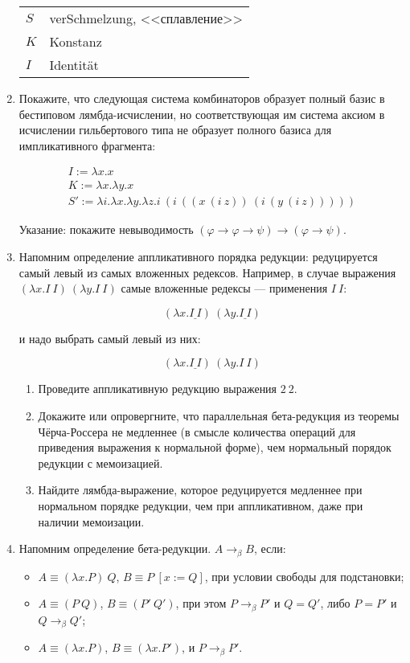 \documentclass[10pt,a4paper,oneside]{article}
\begin{document}
\begin{enumerate}
\begin{tabular}{ll}
$S$ & verSchmelzung, <<сплавление>> \\
$K$ & Konstanz \\
$I$ & Identit\"at
\end{tabular}

\item Покажите, что следующая система комбинаторов образует полный базис в бестиповом
лямбда-исчислении, но соответствующая им система аксиом в исчислении гильбертового типа
не образует полного базиса для импликативного фрагмента:

$$\begin{array}{l}
I := \lambda x.x\\
K := \lambda x.\lambda y.x\\
S' := \lambda i.\lambda x.\lambda y.\lambda z.i\ (i\ ((x\ (i\ z))\ (i\ (y\ (i\ z)))))
\end{array}$$

Указание: покажите невыводимость $(\varphi \rightarrow \varphi \rightarrow \psi) \rightarrow (\varphi \rightarrow \psi)$.

\item Напомним определение аппликативного порядка редукции:
редуцируется самый левый из самых вложенных редексов. Например, в случае выражения
$(\lambda x.I\ I)\ (\lambda y.I\ I)$ самые вложенные редексы --- применения $I\ I$:

$$(\lambda x.\underline{I\ I})\ (\lambda y.\underline{I\ I})$$

и надо выбрать самый левый из них:

$$(\lambda x.\underline{I\ I})\ (\lambda y.I\ I)$$
\begin{enumerate}
\item Проведите аппликативную редукцию выражения $2\ 2$.
\item Докажите или опровергните, что параллельная бета-редукция из теоремы Чёрча-Россера не медленнее 
(в смысле количества операций для приведения выражения к нормальной форме), чем нормальный порядок 
редукции с мемоизацией.
\item Найдите лямбда-выражение, которое редуцируется медленнее при нормальном порядке редукции,
чем при аппликативном, даже при наличии мемоизации.
\end{enumerate}

\item Напомним определение бета-редукции. $A \rightarrow_\beta B$, если:
\begin{itemize}
\item $A \equiv (\lambda x.P)\ Q$, $B \equiv P\ [x := Q]$, при условии свободы для подстановки;
\item $A \equiv (P\ Q)$, $B \equiv (P'\ Q')$, при этом $P \rightarrow_\beta P'$ и $Q = Q'$, либо $P = P'$ и $Q \rightarrow_\beta Q'$;
\item $A \equiv (\lambda x.P)$, $B \equiv (\lambda x.P')$, и $P \rightarrow_\beta P'$.
\end{itemize}


\end{enumerate}
\end{document}
